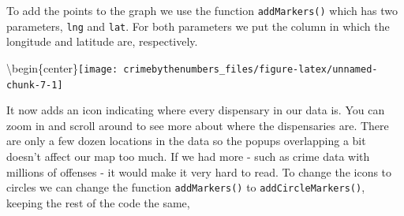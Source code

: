 \documentclass[
]{krantz}
\makeatletter
\newenvironment{Shaded}{\begin{snugshade}}{\end{snugshade}}
\newcommand{\AttributeTok}[1]{\textcolor[rgb]{0.61,0.61,0.61}{#1}}
\newcommand{\FunctionTok}[1]{\textcolor[rgb]{0,0,0}{#1}}
\newcommand{\NormalTok}[1]{#1}
\newcommand{\SpecialCharTok}[1]{\textcolor[rgb]{0,0,0}{#1}}
\newcommand{\StringTok}[1]{\textcolor[rgb]{0.5,0.5,0.5}{#1}}
\newenvironment{kframe}{%
\medskip{}
\setlength{\fboxsep}{.8em}
 \def\at@end@of@kframe{}%
 \ifinner\ifhmode%
  \def\at@end@of@kframe{\end{minipage}}%
  \begin{minipage}{\columnwidth}%
 \fi\fi%
 \def\FrameCommand##1{\hskip\@totalleftmargin \hskip-\fboxsep
 \colorbox{shadecolor}{##1}\hskip-\fboxsep
     \hskip-\linewidth \hskip-\@totalleftmargin \hskip\columnwidth}%
 \MakeFramed {\advance\hsize-\width
   \@totalleftmargin\z@ \linewidth\hsize
   \@setminipage}}%
 {\par\unskip\endMakeFramed%
 \at@end@of@kframe}
\renewenvironment{Shaded}{\begin{kframe}}{\end{kframe}}
\makeatother
\begin{document}
To add the points to the graph we use the function \texttt{addMarkers()} which has two parameters, \texttt{lng} and \texttt{lat}. For both parameters we put the column in which the longitude and latitude are, respectively.

\begin{Shaded}
\end{Shaded}

\textbackslash begin\{center\}\texttt{[image: crimebythenumbers\_files/figure-latex/unnamed-chunk-7-1]}

It now adds an icon indicating where every dispensary in our data is. You can zoom in and scroll around to see more about where the dispensaries are. There are only a few dozen locations in the data so the popups overlapping a bit doesn't affect our map too much. If we had more - such as crime data with millions of offenses - it would make it very hard to read. To change the icons to circles we can change the function \texttt{addMarkers()} to \texttt{addCircleMarkers()}, keeping the rest of the code the same,

\begin{Shaded}
\end{Shaded}
\end{document}
